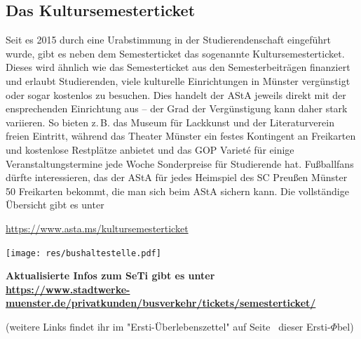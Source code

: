 \begin{multicols*}{2}
\subsection{Das Kultursemesterticket}
Seit es 2015 durch eine Urabstimmung in der Studierendenschaft eingeführt wurde, gibt es neben dem Semesterticket das sogenannte Kultursemesterticket. Dieses wird ähnlich wie das Semesterticket aus den Semesterbeiträgen finanziert und erlaubt Studierenden, viele kulturelle Einrichtungen in Münster vergünstigt oder sogar kostenlos zu besuchen. Dies handelt der AStA jeweils direkt mit der ensprechenden Einrichtung aus – der Grad der Vergünstigung kann daher stark variieren. So bieten z.\,B. das Museum für Lackkunst und der Literaturverein freien Eintritt, während das Theater Münster ein festes Kontingent an Freikarten und kostenlose Restplätze anbietet und das GOP Variet\'e für einige Veranstaltungstermine jede Woche Sonderpreise für Studierende hat. Fußballfans dürfte interessieren, das der AStA für jedes Heimspiel des SC Preußen Münster 50 Freikarten bekommt, die man sich beim AStA sichern kann.
Die vollständige Übersicht gibt es unter
\vspace{-1ex}
\begin{center}
	\url{https://www.asta.ms/kultursemesterticket}
\end{center}

\smallskip

\begin{center}
	\texttt{[image: res/bushaltestelle.pdf]}

	{\bfseries
	Aktualisierte Infos zum SeTi gibt es unter\\
	\url{https://www.stadtwerke-muenster.de/privatkunden/busverkehr/tickets/semesterticket/}}
	
	(weitere Links findet ihr im "Ersti-Überlebenszettel" auf Seite~\pageref{dpü} dieser Ersti-$\Phi$bel)
\end{center}

\end{multicols*}
